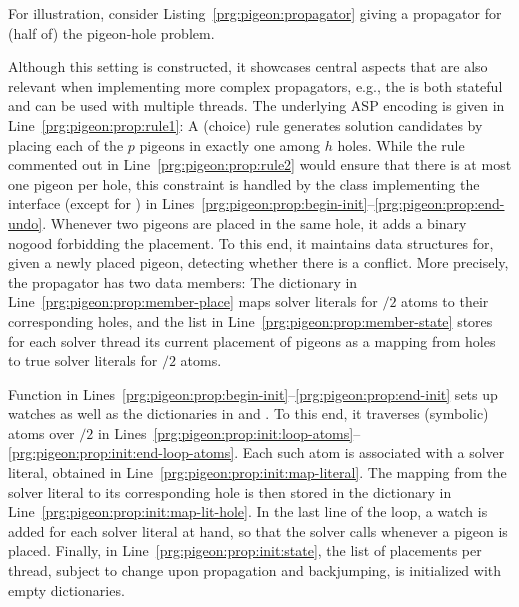For illustration,
consider Listing~\ref{prg:pigeon:propagator} giving a propagator for (half of) the pigeon-hole problem.
%

%
Although this setting is constructed, it showcases central aspects
that are also relevant when implementing more complex propagators,
e.g., the  is both stateful and can be used with multiple threads.
%
The underlying ASP encoding is given in Line~\ref{prg:pigeon:prop:rule1}:
A (choice) rule generates solution candidates by placing each of the $p$ pigeons in exactly one among $h$ holes.
While the rule commented out in Line~\ref{prg:pigeon:prop:rule2} would ensure that there is at most one pigeon per hole,
this constraint is handled by the  class
implementing the  interface (except for ) in Lines~\ref{prg:pigeon:prop:begin-init}--\ref{prg:pigeon:prop:end-undo}.
Whenever two pigeons are placed in the same hole, it adds a binary nogood forbidding the placement.
To this end,
it maintains data structures for, given a newly placed pigeon,
detecting whether there is a conflict.
%
More precisely, the propagator has two data members:
The  dictionary in Line~\ref{prg:pigeon:prop:member-place} maps solver literals
for $/2$ atoms to their corresponding holes,
and the  list in Line~\ref{prg:pigeon:prop:member-state} stores for each solver thread its current placement of pigeons
as a mapping from holes to true solver literals for $/2$ atoms.

Function  in Lines~\ref{prg:pigeon:prop:begin-init}--\ref{prg:pigeon:prop:end-init}
sets up watches as well as the dictionaries in  and .
%
To this end,
it traverses (symbolic) atoms over $/2$ in Lines~\ref{prg:pigeon:prop:init:loop-atoms}--\ref{prg:pigeon:prop:init:end-loop-atoms}.
Each such atom is associated with a solver literal, %
obtained in Line~\ref{prg:pigeon:prop:init:map-literal}.
The mapping from the solver literal to its corresponding hole is then stored in the  dictionary in
Line~\ref{prg:pigeon:prop:init:map-lit-hole}.
%
In the last line of the loop, a watch is added for each solver literal at hand,
so that the solver calls  whenever a pigeon is placed. %
%
Finally, in Line~\ref{prg:pigeon:prop:init:state}, the  list
of placements per thread,
subject to change upon propagation and backjumping,
is initialized with empty dictionaries.


